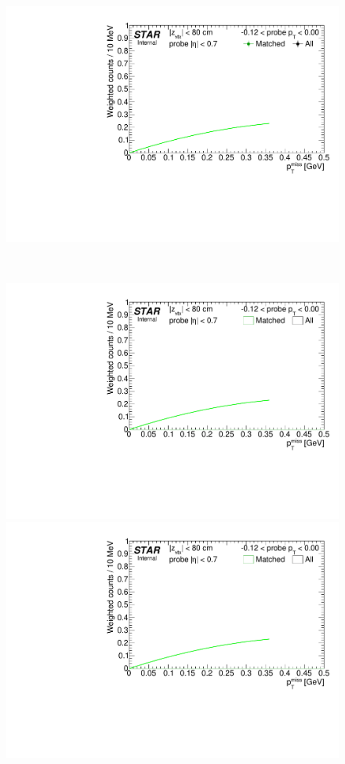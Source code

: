 \begin{figure}[h!]
{  \includegraphics[width=\linewidth,page=6]{graphics/systematicsEfficiency/TOF_tagAndProbe/Fitting_effVsPt_data.CPT.pdf}

}~
\parbox{0.495\textwidth}{
  \centering
\vspace{175pt}
  \includegraphics[width=\linewidth,page=5]{graphics/systematicsEfficiency/TOF_tagAndProbe/Fitting_effVsPt_mc.CPT.pdf}\\
  \includegraphics[width=\linewidth,page=6]{graphics/systematicsEfficiency/TOF_tagAndProbe/Fitting_effVsPt_mc.CPT.pdf}

}
\end{figure}
